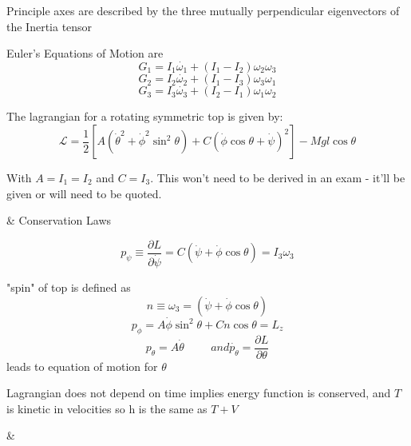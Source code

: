 \documentclass[table,cmyk]{article}
\begin{document}
\begin{longtable}
Principle axes are described by the three mutually perpendicular eigenvectors of the Inertia tensor

Euler's Equations of Motion are
\[
G_1 = I_1 \dot{\omega_1} + (I_1 - I_2)\omega_2 \omega_3\]
\[G_2 = I_2 \dot{\omega_2} + (I_1 - I_3)\omega_3 \omega_1\]
\[G_3 = I_3 \dot{\omega_3} + (I_2 - I_1)\omega_1 \omega_2 \]

  The lagrangian for a rotating symmetric top is given by:
  \begin{displaymath}
   \mathcal{L}
   =\frac{1}{2}[A(\dot\theta^2+\dot\phi^2\sin^2\theta)+C(\dot\phi\cos\theta + \dot\psi)^2]-Mgl\cos\theta
  \end{displaymath}
 
  With $A=I_1=I_2$ and $C=I_3$. This won't need to be derived in an exam - it'll be given or will need to be quoted.

 &
  Conservation Laws 
  
  \[ p_{\psi} \equiv \frac{\partial L}{\partial \dot{\psi}} = C(\dot{\psi} + \dot{\phi}\cos \theta) = I_3 \omega_3\]
  
  "spin" of top is defined as
  \[n\equiv \omega_3 = (\dot{\psi} + \dot{\phi}\cos\theta)\] 
  \[p_{\phi}  = A\dot{\phi}\sin^2 \theta + Cn \cos \theta = L_z\]
  \[ p_{\theta} = A \dot{\theta} \hspace{1cm} and \dot{p_{\theta}} = \frac{\partial L}{\partial \theta}\]
  leads to equation of motion for $\theta$
  
  Lagrangian does not depend on time implies energy function is conserved, and $T$ is kinetic in velocities so h is the same as $T+V$

  &
  

\end{longtable}
\end{document}
